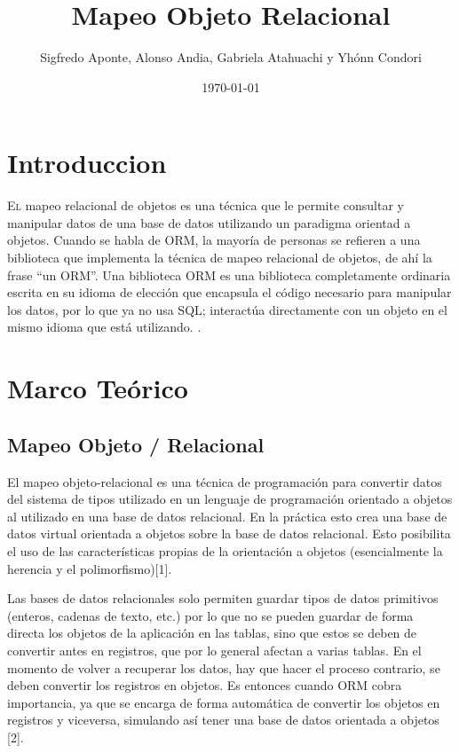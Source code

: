 \documentclass[twoside,twocolumn]{article}
\title{Mapeo Objeto Relacional} %
\author{Sigfredo Aponte, Alonso Andia, Gabriela Atahuachi y Yhónn Condori}
\date{\today} %
\begin{document}
\maketitle
\section{Introduccion}
\lettrine[nindent=0em,lines=3]{E}l mapeo relacional de objetos es una técnica que le permite consultar y manipular datos de una base de datos utilizando un paradigma orientad a objetos. Cuando se habla de ORM, la mayoría de personas se refieren a una biblioteca que implementa la técnica de mapeo relacional de objetos, de ahí la frase “un ORM”.
Una biblioteca ORM es una biblioteca completamente ordinaria escrita en su idioma de elección que encapsula el código necesario para manipular los datos, por lo que ya no usa SQL; interactúa directamente con un objeto en el mismo idioma que está utilizando.
.




\section{Marco Teórico}
\subsection{Mapeo Objeto / Relacional}

El mapeo objeto-relacional es una técnica de programación para convertir datos del sistema de tipos utilizado en un lenguaje de programación orientado a objetos al utilizado en una base de datos relacional. En la práctica esto crea una base de datos virtual orientada a objetos sobre la base de datos relacional. Esto posibilita el uso de las características propias de la orientación a objetos (esencialmente la herencia y el polimorfismo)[1].

Las bases de datos relacionales solo permiten guardar tipos de datos primitivos (enteros, cadenas de texto, etc.) por lo que no se pueden guardar de forma directa los objetos de la aplicación en las tablas, sino que estos se deben de convertir antes en registros, que por lo general afectan a varias tablas. En el momento de volver a recuperar los datos, hay que hacer el proceso contrario, se deben convertir los registros en objetos. Es entonces cuando ORM cobra importancia, ya que se encarga de forma automática de convertir los objetos en registros y viceversa, simulando así tener una base de datos orientada a objetos [2].
\end{document}
